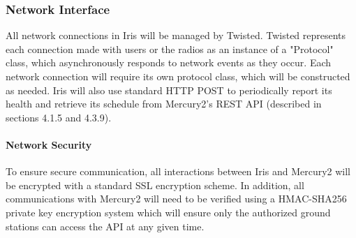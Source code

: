 \documentclass{mxl-note}
\begin{document}
\subsubsection{Network Interface}
All network connections in Iris will be managed by Twisted. Twisted represents each connection made with users or the radios as an instance of a "Protocol" class, which asynchronously responds to network events as they occur. Each network connection will require its own protocol class, which will be constructed as needed. Iris will also use standard HTTP POST to periodically report its health and retrieve its schedule from Mercury2's REST API (described in sections 4.1.5 and 4.3.9). 

\paragraph{Network Security}
To ensure secure communication, all interactions between Iris and Mercury2 will be encrypted with a standard SSL encryption scheme. In addition, all communications with Mercury2 will need to be verified using a HMAC-SHA256 private key encryption system which will ensure only the authorized ground stations can access the API at any given time.
\end{document}
